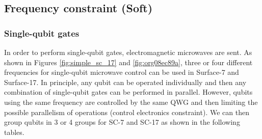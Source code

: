 












\subsection*{Frequency constraint (Soft)}
\label{sec:orgff4c391}

\subsubsection*{Single-qubit gates}

In order to perform single-qubit gates, electromagnetic microwaves are sent. As shown in Figures \ref{fig:simple_sc_17} and \ref{fig:org08ec89a}, three or four different frequencies for single-qubit microwave control can be used in Surface-7 and Surface-17. In principle, any qubit can be operated individually and then any combination of single-qubit gates can be performed in parallel. However, qubits using the same frequency are controlled by the same QWG and then limiting the possible parallelism of operations (control electronics constraint). We can then group qubits in 3 or 4 groups for SC-7 and SC-17 as shown in the following tables.




